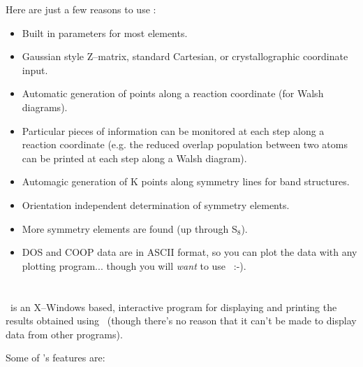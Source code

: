 Here are just a few reasons to use \calcprog:
\begin{itemize}

\item Built in parameters for most elements.

\item Gaussian style Z--matrix, standard Cartesian, or
crystallographic coordinate input. 

\item Automatic generation of points along a reaction coordinate (for
Walsh diagrams).

\item Particular pieces of information can be monitored at each step
along a reaction coordinate (e.g. the reduced overlap population
between two atoms can be printed at each step along a Walsh diagram).

\item Automagic generation of K points along symmetry lines for band
structures.

\item Orientation independent determination of symmetry elements.

\item More symmetry elements are found (up through S$_8$).

\item DOS and COOP data are in ASCII format, so you can plot the data
with any plotting program... though you will {\em want} to use
\viewprog\ :-).

\end{itemize}


\section{\viewprog}

\viewprog\ is an X--Windows based, interactive program for displaying
and printing the results obtained using \calcprog\ (though there's no
reason that it can't be made to display data from other programs).

Some of \viewprog's features are:

